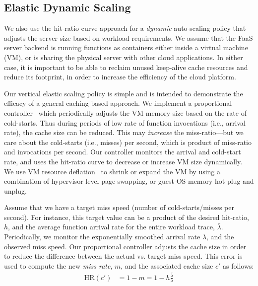 

\subsection{Elastic Dynamic Scaling}
\label{subsec:dynamic}
\vspace*{\subsecspace}

We also use the hit-ratio curve approach for a \emph{dynamic} auto-scaling policy that adjusts the server size based on workload requirements. 
%
We assume that the FaaS server backend is running functions as containers either inside a virtual machine (VM), or is sharing the physical server with other cloud applications. 
In either case, it is important to be able to reclaim unused keep-alive cache resources and reduce its footprint, in order to increase the efficiency of the cloud platform. 

Our vertical elastic scaling policy is simple and is intended to demonstrate the efficacy of a general caching based approach. 
We implement a  proportional controller~\cite{pid-wiki} which periodically adjusts the VM memory size based on the rate of cold-starts.  
Thus during periods of low rate of function invocations (i.e., arrival rate), the cache size can be reduced. 
This may \emph{increase} the miss-ratio---but we care about the cold-starts (i.e., misses) per second, which is product of miss-ratio and invocations per second.
Our controller monitors the arrival and cold-start rate, and uses the hit-ratio curve to decrease or increase VM size dynamically. 
We use VM resource deflation~\cite{deflation-eurosys19} to shrink or expand the VM by using a combination of hypervisor level page swapping, or guest-OS memory hot-plug and unplug. 


Assume that we have a target miss speed (number of cold-starts/misses per second).
For instance, this target value can be a product of the desired hit-ratio, $h$, and the average function arrival rate for the entire workload trace, $\bar{\lambda}$. 
Periodically, we monitor the exponentially smoothed arrival rate $\lambda$, and the observed miss speed.
Our proportional controller adjusts the cache size in order to reduce the difference between the actual vs. target miss speed.
This error is used to compute the new \emph{miss rate}, $m$, and the associated cache size $c'$ as follows:
\begin{align}
  \label{eq:dyn}
  \text{HR}(c') & = 1-m = 1 - h\frac{\bar{\lambda}}{\lambda}
\end{align}

